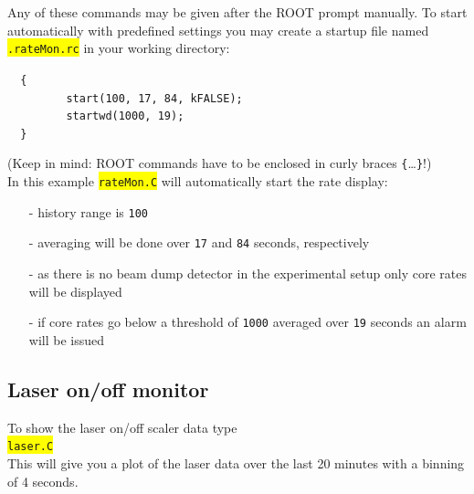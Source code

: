 \documentclass[10pt]{article}
\newcommand{\yellow}[1]{\colorbox{yellow}{\texttt{#1}}}
\newenvironment{blueboxed}
	{\begin{Sbox}\begin{minipage}[t]}
	{\end{minipage}\end{Sbox}\colorbox{lightblue}{\TheSbox}}
\begin{document}
Any of these commands may be given after the ROOT prompt manually. To start automatically with predefined settings you may
create a startup file named \yellow{.rateMon.rc} in your working directory:\\

\begin{center}
\begin{blueboxed}{.75\linewidth}
\verb+	{+\\
\verb+         start(100, 17, 84, kFALSE);+\\
\verb+         startwd(1000, 19);+\\
\verb+	}+
\end{blueboxed}
\end{center}

(Keep in mind: ROOT commands have to be enclosed in curly braces \verb+{+\dots\verb+}+!)\\

In this example \yellow{rateMon.C} will automatically start the rate display:
\begin{itemize}
\setlength{\rightmargin}{1em}%
\setlength{\leftmargin}{2em}%
\setlength{\itemsep}{0pt}%
\setlength{\parskip}{1mm}%
\setlength{\partopsep}{0pt}%
\setlength{\parsep}{0pt}%
\setlength{\topsep}{0pt}%
	\item[-]	history range is \texttt{100}
	\item[-]	averaging will be done over \texttt{17} and \texttt{84} seconds, respectively
	\item[-]	as there is no beam dump detector in the experimental setup only core rates will be displayed
	\item[-]	if core rates go below a threshold of \texttt{1000} averaged over \texttt{19} seconds an alarm will be issued
\end{itemize}
\newpage
\subsection{Laser on/off monitor}\vspace{3mm}

To show the laser on/off scaler data type\\

\hspace*{.2\linewidth}\yellow{laser.C}\\

This will give you a plot of the laser data over the last 20 minutes with a binning of 4 seconds.
\end{document}
